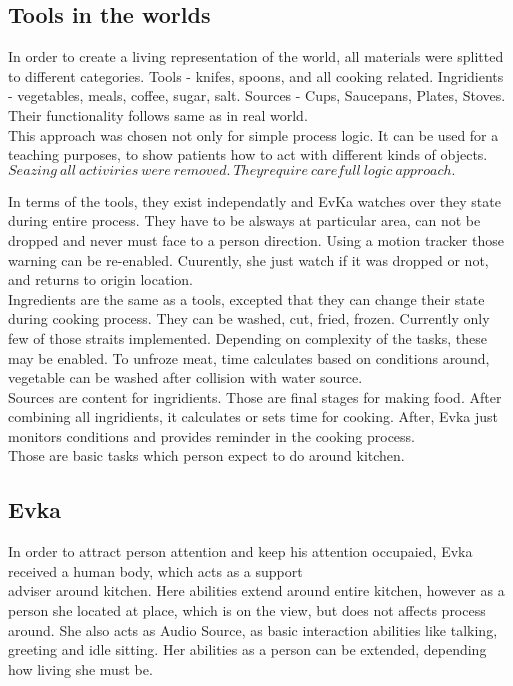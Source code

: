 \documentclass[18pt]{article}
\numberwithin{equation}{section} %
\numberwithin{figure}{section} %
\numberwithin{table}{section} %
\begin{document}
	\subsection{Tools in the worlds}
	In order to create a living representation of the world, all materials were splitted to different categories. Tools - knifes, spoons, and all cooking related. Ingridients - vegetables, meals, coffee, sugar, salt. Sources - Cups, Saucepans, Plates, Stoves. Their functionality follows same as in real world. \\

	This approach was chosen not only for simple process logic. It can be used for a teaching purposes, to show patients how to act with different kinds of objects. \\
	
	$ Seazing\ all\ activiries\ were\ removed.\ They require\ carefull\ logic\ approach. $
	
	In terms of the tools, they exist independatly and EvKa watches over they state during entire process. They have to be alsways at particular area, can not be dropped and never must face to a person direction. Using a motion tracker those warning can be re-enabled. Cuurently, she just watch if it was dropped or not, and returns to origin location. \\
	
	Ingredients are the same as a tools, excepted that they can change their state during cooking process. They can be washed, cut, fried, frozen. Currently only few of those straits implemented. Depending on complexity of the tasks, these may be enabled. To unfroze meat, time calculates based on conditions around, vegetable can be washed after collision with water source. \\
	
	Sources are content for ingridients. Those are final stages for making food. After combining all ingridients, it calculates or sets time for cooking. After, Evka just monitors conditions and provides reminder in the cooking process. \\
	
	Those are basic tasks which person expect to do around kitchen. 
	
	\subsection{Evka}
	In order to attract person attention and keep his attention occupaied, Evka received a human body, which acts as a support\\adviser around kitchen. Here abilities extend around entire kitchen, however as a person she located at place, which is on the view, but does not affects process around. She also acts as Audio Source, as basic interaction abilities like talking, greeting and idle sitting. Her abilities as a person can be extended, depending how living she must be. \\
	
\end{document}
